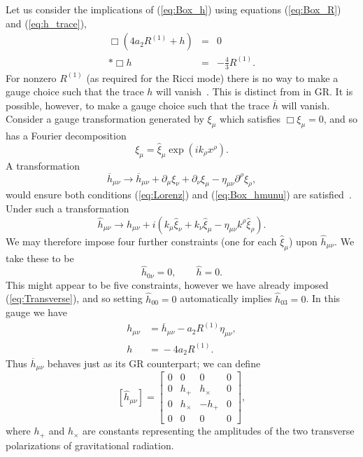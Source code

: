 \documentclass[aps,prd,amsfonts,amssymb,amsmath,nofootinbib,reprint,showpacs]{revtex4-1}
\newcommand{\eqnref}[1]{(\ref{eq:#1})}
\begin{document}
Let us consider the implications of \eqnref{Box_h} using equations \eqnref{Box_R} and \eqnref{h_trace},
\begin{eqnarray}
\Box\left(4a_2R^{(1)} + h\right) & = & 0 \nonumber \\*
\Box h & = & -\frac{4}{3}R^{(1)}.
\end{eqnarray}
For nonzero $R^{(1)}$ (as required for the Ricci mode) there is no way to make a gauge choice such that the trace $h$ will vanish~\cite{Corda2008, Capozziello2008}. This is distinct from in GR. It is possible, however, to make a gauge choice such that the trace $\overline{h}$ will vanish. Consider a gauge transformation generated by $\xi_\mu$ which satisfies $\Box \xi_\mu = 0$, and so has a Fourier decomposition
\begin{equation}
\xi_\mu = \widehat{\xi}_\mu \exp\left(ik_\rho x^\rho\right).
\end{equation}
A transformation
\begin{equation}
\overline{h}_{\mu\nu} \rightarrow \overline{h}_{\mu\nu} + \partial_\mu\xi_\nu + \partial_\nu\xi_\mu - \eta_{\mu\nu}\partial^\rho\xi_\rho,
\end{equation}
would ensure both conditions \eqnref{Lorenz} and \eqnref{Box_hmunu} are satisfied~\cite{Misner1973}. Under such a transformation
\begin{equation}
\widehat{h}_{\mu\nu} \rightarrow \widehat{h}_{\mu\nu} + i\left(k_\mu\widehat{\xi}_\nu + k_\nu\widehat{\xi}_\mu - \eta_{\mu\nu}k^\rho\widehat{\xi}_\rho\right).
\end{equation}
We may therefore impose four further constraints (one for each $\widehat{\xi}_\mu$) upon $\widehat{h}_{\mu\nu}$. We take these to be
\begin{equation}
\widehat{h}_{0\nu} = 0, \qquad \widehat{h} = 0.
\end{equation}
This might appear to be five constraints, however we have already imposed \eqnref{Transverse}, and so setting $\widehat{h}_{00} = 0$ automatically implies $\widehat{h}_{03} = 0$. In this gauge we have
\begin{equation}
\begin{split}
h_{\mu\nu} & = {} \overline{h}_{\mu\nu} - a_2 R^{(1)}\eta_{\mu\nu},\\
h & = {} -4a_2R^{(1)}.
\end{split}
\label{eq:gauge}
\end{equation}
Thus $\overline{h}_{\mu\nu}$ behaves just as its GR counterpart; we can define
\begin{equation}
\left[\widehat{h}_{\mu\nu}\right] =
\begin{bmatrix}
0 & 0 & 0 & 0\\
0 & h_+ & h_\times & 0\\
0 & h_\times & -h_+ & 0\\
0 & 0 & 0 & 0
\end{bmatrix},
\end{equation}
where $h_+$ and $h_\times$ are constants representing the amplitudes of the two transverse polarizations of gravitational radiation.
\end{document}
